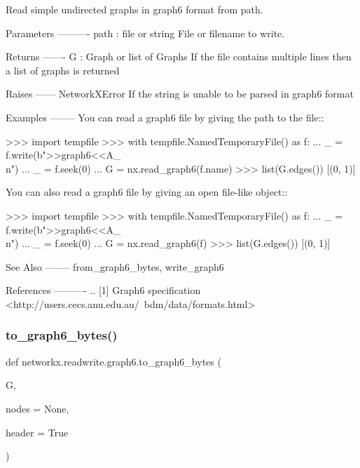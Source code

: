 \begin{DoxyVerb}Read simple undirected graphs in graph6 format from path.

Parameters
----------
path : file or string
   File or filename to write.

Returns
-------
G : Graph or list of Graphs
   If the file contains multiple lines then a list of graphs is returned

Raises
------
NetworkXError
    If the string is unable to be parsed in graph6 format

Examples
--------
You can read a graph6 file by giving the path to the file::

    >>> import tempfile
    >>> with tempfile.NamedTemporaryFile() as f:
    ...     _ = f.write(b">>graph6<<A_\\n")
    ...     _ = f.seek(0)
    ...     G = nx.read_graph6(f.name)
    >>> list(G.edges())
    [(0, 1)]

You can also read a graph6 file by giving an open file-like object::

    >>> import tempfile
    >>> with tempfile.NamedTemporaryFile() as f:
    ...     _ = f.write(b">>graph6<<A_\\n")
    ...     _ = f.seek(0)
    ...     G = nx.read_graph6(f)
    >>> list(G.edges())
    [(0, 1)]

See Also
--------
from_graph6_bytes, write_graph6

References
----------
.. [1] Graph6 specification
       <http://users.cecs.anu.edu.au/~bdm/data/formats.html>\end{DoxyVerb}
 \mbox{\label{namespacenetworkx_1_1readwrite_1_1graph6_a99cb348e0bac6ccce5f644d97e1ae116}} 
\subsubsection{\texorpdfstring{to\+\_\+graph6\+\_\+bytes()}{to\_graph6\_bytes()}}
{\footnotesize\ttfamily def networkx.\+readwrite.\+graph6.\+to\+\_\+graph6\+\_\+bytes (\begin{DoxyParamCaption}\item[{}]{G,  }\item[{}]{nodes = {\ttfamily None},  }\item[{}]{header = {\ttfamily True} }\end{DoxyParamCaption})}

